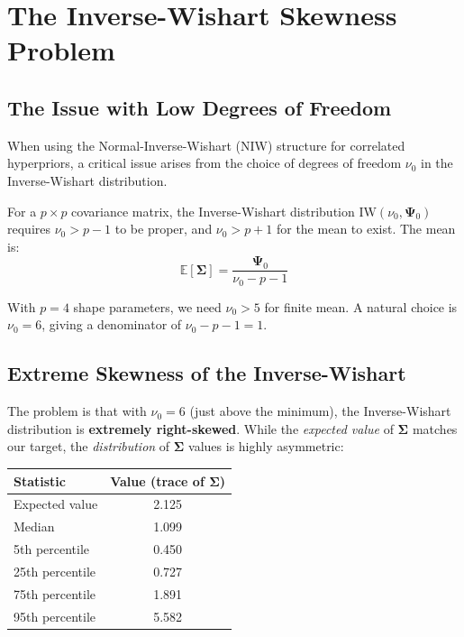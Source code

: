 \documentclass[11pt]{article}
\newcommand{\E}{\mathbb{E}}
\begin{document}
\section{The Inverse-Wishart Skewness Problem}
\label{sec:iw-skewness}

\subsection{The Issue with Low Degrees of Freedom}

When using the Normal-Inverse-Wishart (NIW) structure for correlated hyperpriors, a critical issue arises from the choice of degrees of freedom $\nu_0$ in the Inverse-Wishart distribution.

For a $p \times p$ covariance matrix, the Inverse-Wishart distribution $\text{IW}(\nu_0, \boldsymbol{\Psi}_0)$ requires $\nu_0 > p - 1$ to be proper, and $\nu_0 > p + 1$ for the mean to exist. The mean is:
\[
  \E[\boldsymbol{\Sigma}] = \frac{\boldsymbol{\Psi}_0}{\nu_0 - p - 1}
\]

With $p = 4$ shape parameters, we need $\nu_0 > 5$ for finite mean. A natural choice is $\nu_0 = 6$, giving a denominator of $\nu_0 - p - 1 = 1$.

\subsection{Extreme Skewness of the Inverse-Wishart}

The problem is that with $\nu_0 = 6$ (just above the minimum), the Inverse-Wishart distribution is \textbf{extremely right-skewed}. While the \textit{expected value} of $\boldsymbol{\Sigma}$ matches our target, the \textit{distribution} of $\boldsymbol{\Sigma}$ values is highly asymmetric:

\begin{center}
\begin{tabular}{lc}
\toprule
Statistic & Value (trace of $\boldsymbol{\Sigma}$) \\
\midrule
Expected value & 2.125 \\
Median & 1.099 \\
5th percentile & 0.450 \\
25th percentile & 0.727 \\
75th percentile & 1.891 \\
95th percentile & 5.582 \\
\bottomrule
\end{tabular}
\end{center}
\end{document}
